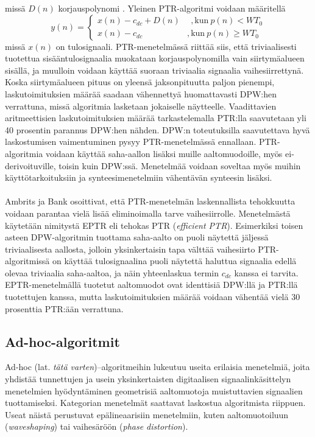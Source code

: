 \documentclass[finnish,12pt,a4paper,pdftex]{article} %
\begin{document}
missä $D(n)$ korjauspolynomi \cite{Koodi}. Yleinen PTR-algoritmi voidaan määritellä 
\begin{equation}
y(n) = \left\{
  \begin{array}{lr}
    x(n) - c_{dc} + D(n)	& \ \ , \text{kun} \ p(n) < WT_0 \\
    x(n) - c_{dc}  		 	& ,  \text{kun} \ p(n) \geq WT_0
  \end{array}
\right.
\end{equation}
missä $x(n)$ on tulosignaali. PTR-menetelmässä riittää siis, että triviaalisesti tuotettua sisääntulosignaalia muokataan korjauspolynomilla vain siirtymäalueen sisällä, ja muulloin voidaan käyttää suoraan triviaalia signaalia vaihesiirrettynä. Koska siirtymäalueen pituus on yleensä jaksonpituutta paljon pienempi, laskutoimituksien määrää saadaan vähennettyä huomattavasti DPW:hen verrattuna, missä algoritmia lasketaan jokaiselle näytteelle. Vaadittavien aritmeettisien laskutoimituksien määrää tarkastelemalla PTR:lla saavutetaan yli 40 prosentin parannus DPW:hen nähden.  DPW:n toteutuksilla saavutettava hyvä laskostumisen vaimentuminen pysyy PTR-menetelmässä ennallaan. PTR-algoritmia voidaan käyttää saha-aallon lisäksi muille aaltomuodoille, myös ei-derivoituville, toisin kuin DPW:ssä. Menetelmää voidaan soveltaa myös muihin käyttötarkoituksiin ja synteesimenetelmiin vähentävän synteesin lisäksi. \cite{Kleimola2013, Kleimola2012} \\\\
Ambrits ja Bank osoittivat, että PTR-menetelmän laskennallista tehokkuutta voidaan parantaa vielä lisää eliminoimalla tarve vaihesiirrolle. Menetelmästä käytetään nimitystä EPTR eli tehokas PTR (\textit{efficient PTR}). Esimerkiksi toisen asteen DPW-algoritmin tuottama saha-aalto on puoli näytettä jäljessä triviaalisesta aallosta, jolloin yksinkertaisin tapa välttää vaihesiirto PTR-algoritmissä on käyttää tulosignaalina puoli näytettä haluttua signaalia edellä olevaa triviaalia saha-aaltoa, ja näin yhteenlaskua termin $c_{dc}$ kanssa ei tarvita. EPTR-menetelmällä tuotetut aaltomuodot ovat identtisiä DPW:llä ja PTR:llä tuotettujen kanssa, mutta laskutoimituksien määrää voidaan vähentää vielä 30 prosenttia PTR:ään verrattuna. \cite{Bank2013}

\subsection{Ad-hoc-algoritmit}

Ad-hoc (lat. \textit{tätä varten})--algoritmeihin lukeutuu useita erilaisia menetelmiä, joita yhdistää tunnettujen ja usein yksinkertaisten digitaalisen signaalinkäsittelyn menetelmien hyödyntäminen geometrisiä aaltomuotoja muistuttavien signaalien tuottamiseksi. Kategorian menetelmät saattavat laskostua algoritmista riippuen. Useat näistä perustuvat epälineaarisiin menetelmiin, kuten aaltomuotoiluun (\textit{waveshaping}) tai vaihesäröön (\textit{phase distortion}). \cite{Pekonen2014, Kleimola2013, Timoney2009}
\end{document}
